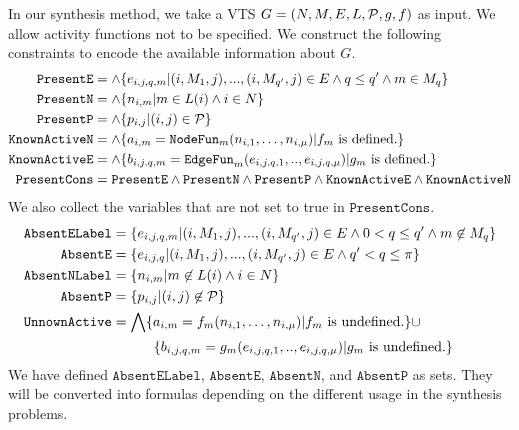 In our synthesis method, we take a VTS $G =
(N,M,E,L,\mathcal{P},g,f)$ as input.
%
We allow activity functions not to be specified.
%
We construct the following constraints to encode the available information
about $G$.
%
\begin{align*}
  \texttt{PresentE} &= \land \{e_{i,j,q,m}|(i,M_1,j),...,(i,M_{q'},j) \in E \land q \leq q' \land m \in M_q \}\\
  \texttt{PresentN} &= \land \{n_{i,m}| m \in L(i) \land i \in N \}\\
  \texttt{PresentP} &= \land \{p_{i,j}| (i,j) \in \mathcal{P} \} \\
  \texttt{KnownActiveN} &= \land \{ a_{i,m} = \texttt{NodeFun}_m (n_{i,1},\dots,n_{i,\mu}) | f_m \text{ is defined.} \} \\
  \texttt{KnownActiveE} &= \land \{ b_{i,j,q,m} = \texttt{EdgeFun}_m(e_{i,j,q,1}, .., e_{i,j,q,\mu})
                   | g_m \text{ is defined.} \} \\
  \texttt{PresentCons} & = \texttt{PresentE} \land \texttt{PresentN} \land 
 \texttt{PresentP} \land \texttt{KnownActiveE} \land \texttt{KnownActiveN}
\end{align*}
We also collect the variables that are not set to true in $\texttt{PresentCons}$.
\begin{align*}
  \texttt{AbsentELabel} &=
  \{e_{i,j,q,m}|(i,M_1,j),...,(i,M_{q'},j) \in E \land 
                          0 < q \leq q' \land m \not\in M_{q} \}\\
  \texttt{AbsentE} &= \{e_{i,j,q}|(i,M_1,j),...,(i,M_{q'},j) \in E \land 
                    q' < q \leq \pi \}\\
  \texttt{AbsentNLabel} &= \{n_{i,m}| m \not\in L(i) \land i \in N \}\\
  \texttt{AbsentP} &= \{p_{i,j}| (i,j) \not\in \mathcal{P} \} \\
  \texttt{UnnownActive} &=  \bigwedge \{ a_{i,m} = f_m (n_{i,1},\dots,n_{i,\mu}) | f_m \text{ is undefined.} \} {\cup} \\
   &\quad\quad\quad  \{ b_{i,j,q,m} = g_m(e_{i,j,q,1}, .., e_{i,j,q,\mu})
                   | g_m \text{ is undefined.} \}
\end{align*}
We have defined $\texttt{AbsentELabel}$, $\texttt{AbsentE}$, $\texttt{AbsentN}$, and
$\texttt{AbsentP}$
as sets.
%
They will be converted into formulas depending
on the different usage in the synthesis problems. 


